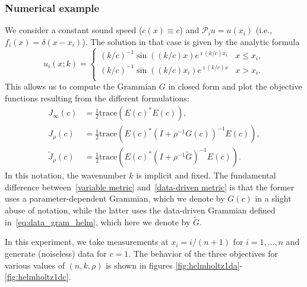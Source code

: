 \documentclass[12pt]{amsart}
\begin{document}
\subsubsection{Numerical example}
We consider a constant sound speed ($c(x)\equiv c$) and $\mathcal{P}_iu = u(x_i)$ (i.e., $f_i(x) = \delta(x-x_i)$). The solution in that case is given by the analytic formula 
\[
u_i(x; k) = 
\begin{cases} 
(k/c)^{-1}\sin((k/c) x)e^{\imath (k/c) x_i}
& x \leq x_i, \\
(k/c)^{-1}\sin((k/c) x_i)e^{\imath (k/c) x}
& x > x_i. \\
\end{cases} 
\]
This allows us to compute the Grammian $G$ in closed form and plot the objective functions resulting from the different formulations:
\begin{align}
J_\infty(c) &= {\textstyle\frac{1}{2}}\text{trace}\left(E(c)^*E(c)\right),\label{conventional}\\
J_\rho(c) &= {\textstyle\frac{1}{2}}\text{trace}\left(E(c)^*\left(I + \rho^{-1}G(c)\right)^{-1}E(c)\right),\label{variable metric}\\
\widetilde{J}_\rho(c) &= {\textstyle\frac{1}{2}}\text{trace}\left(E(c)^*\left(I + \rho^{-1}\widetilde{G}\right)^{-1}E(c)\right).\label{data-driven metric}
\end{align}
In this notation, the wavenumber $k$ is implicit and fixed. The fundamental difference between~\eqref{variable metric} and~\eqref{data-driven metric} is that the former uses a parameter-dependent Grammian, which we denote by $G(c)$ in a slight abuse of notation, while the latter uses the data-driven Grammian defined in~\eqref{eq:data_gram_helm}, which here we denote by $\widetilde{G}$. 

In this experiment, we take measurements at $x_i = i / (n+1)$ for $i = 1, \ldots, n$ and generate (noiseless) data for $c = 1$. The behavior of the three objectives for various values of $(n, k, \rho)$ is shown in figures \ref{fig:helmholtz1da}-\ref{fig:helmholtz1dc}.
\end{document}
